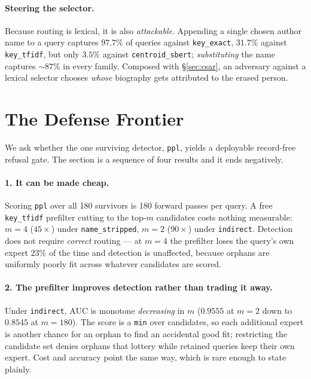 \documentclass[11pt]{article}
\begin{document}
\paragraph{Steering the selector.} \label{sec:steer}
Because routing is lexical, it is also \emph{attackable}. Appending a single chosen author name to a
query captures $97.7\%$ of queries against \texttt{key\_exact}, $31.7\%$ against \texttt{key\_tfidf},
but only $3.5\%$ against \texttt{centroid\_sbert}; \emph{substituting} the name captures ${\sim}87\%$
in every family. Composed with \S\ref{sec:csar}, an adversary against a lexical selector chooses
\emph{whose} biography gets attributed to the erased person.

\section{The Defense Frontier}
\label{sec:defense}

We ask whether the one surviving detector, \texttt{ppl}, yields a deployable record-free refusal
gate. The section is a sequence of four results and it ends negatively.

\paragraph{1. It can be made cheap.} Scoring \texttt{ppl} over all 180 survivors is 180 forward
passes per query. A free \texttt{key\_tfidf} prefilter cutting to the top-$m$ candidates costs
nothing measurable: $m=4$ ($45\times$) under \texttt{name\_stripped}, $m=2$ ($90\times$) under
\texttt{indirect}. Detection does not require \emph{correct} routing --- at $m=4$ the prefilter loses
the query's own expert $23\%$ of the time and detection is unaffected, because orphans are uniformly
poorly fit across whatever candidates are scored.

\paragraph{2. The prefilter improves detection rather than trading it away.} Under
\texttt{indirect}, AUC is monotone \emph{decreasing} in $m$ ($0.9555$ at $m=2$ down to $0.8545$ at
$m=180$). The score is a \texttt{min} over candidates, so each additional expert is another chance
for an orphan to find an accidental good fit; restricting the candidate set denies orphans that
lottery while retained queries keep their own expert. Cost and accuracy point the same way, which is
rare enough to state plainly.
\end{document}
